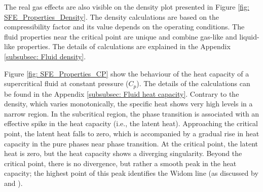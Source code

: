 \documentclass[../Article_Model_Parameters.tex]{subfiles}
\begin{document}
	The real gas effects are also visible on the density plot presented in Figure \ref{fig: SFE_Properties_Density}. The density calculations are based on the compressibility factor and its value depends on the operating conditions. The fluid properties near the critical point are unique and combine gas-like and liquid-like properties. The details of calculations are explained in the Appendix \ref{subsubsec: Fluid density}.
	
	Figure \ref{fig: SFE_Properties_CP} show the behaviour of the heat capacity of a supercritical fluid at constant pressure ($C_p$). The details of the calculations can be found in the Appendix \ref{subsubsec: Fluid heat capacity}. Contrary to the density, which varies monotonically, the specific heat shows very high levels in a narrow region. In the subcritical region, the phase transition is associated with an effective spike in the heat capacity (i.e., the latent heat). Approaching the critical point, the latent heat falls to zero, which is accompanied by a gradual rise in heat capacity in the pure phases near phase transition. At the critical point, the latent heat is zero, but the heat capacity shows a diverging singularity. Beyond the critical point, there is no divergence, but rather a smooth peak in the heat capacity; the highest point of this peak identifies the Widom line (as discussed by \citet{Simeoni2010} and \citet{Banuti2019}).
		
\end{document}
